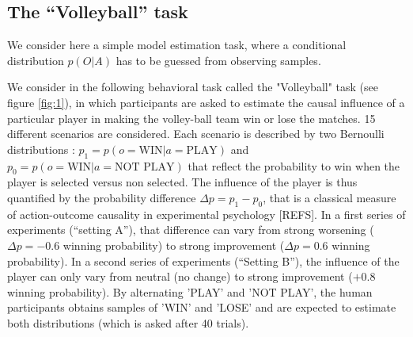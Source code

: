 \documentclass[10pt,letterpaper]{article}
\begin{document}
\subsection{The ``Volleyball'' task}

We consider here a simple model estimation task, where a conditional distribution $p(O|A)$ %
has to be guessed from observing samples. %


We consider in the following behavioral task called the "Volleyball" task (see figure \ref{fig:1})\cite{basanisi2021neurophysiological}, in which participants are asked to estimate the causal influence of a particular player in making the volley-ball team win or lose the matches. 15 different scenarios are considered. Each scenario is described by two Bernoulli distributions : $p_1=p(o=\text{WIN}|a=\text{PLAY})$ and  $p_0=p(o=\text{WIN}|a=\text{NOT PLAY})$ that reflect the probability to win when the player is selected versus non selected. The influence of the player is thus quantified by the probability difference $\Delta p = p_1 - p_0$, that is a classical measure of action-outcome causality in experimental psychology [REFS]. In a first series of experiments (``setting A''), that difference can vary from strong worsening ($\Delta p = -0.6$ winning probability) to strong improvement ($\Delta p = 0.6$ winning probability). In a second series of experiments (``Setting B''), the influence of the player can only vary from neutral (no change) to strong improvement ($+0.8$ winning probability).
By alternating 'PLAY' and 'NOT PLAY', the human participants obtains samples of 'WIN' and 'LOSE' and are expected to estimate both distributions (which is asked after 40 trials).
\end{document}
